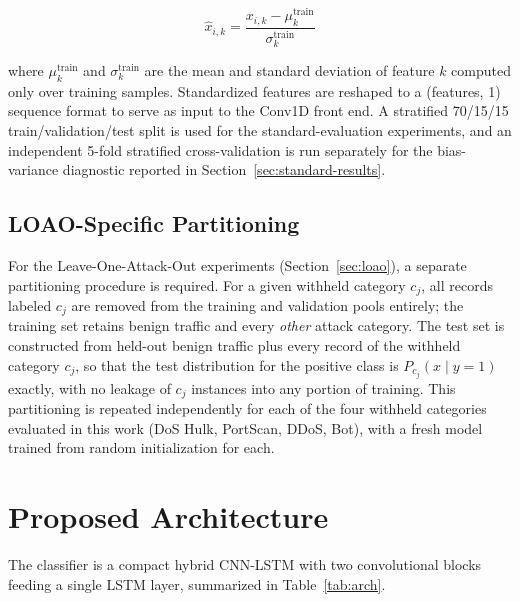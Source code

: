 \documentclass[11pt]{article}
\begin{document}
\begin{equation}
\hat{x}_{i,k} = \frac{x_{i,k} - \mu_k^{\text{train}}}{\sigma_k^{\text{train}}}
\end{equation}

where $\mu_k^{\text{train}}$ and $\sigma_k^{\text{train}}$ are the mean and standard deviation of
feature $k$ computed only over training samples. Standardized features are reshaped to a
(features, 1) sequence format to serve as input to the Conv1D front end. A stratified 70/15/15
train/validation/test split is used for the standard-evaluation experiments, and an independent
5-fold stratified cross-validation is run separately for the bias-variance diagnostic reported in
Section~\ref{sec:standard-results}.

\subsection{LOAO-Specific Partitioning}

For the Leave-One-Attack-Out experiments (Section~\ref{sec:loao}), a separate partitioning
procedure is required. For a given withheld category $c_j$, all records labeled $c_j$ are removed
from the training and validation pools entirely; the training set retains benign traffic and every
\emph{other} attack category. The test set is constructed from held-out benign traffic plus every
record of the withheld category $c_j$, so that the test distribution for the positive class is
$P_{c_j}(x \mid y=1)$ exactly, with no leakage of $c_j$ instances into any portion of training. This
partitioning is repeated independently for each of the four withheld categories evaluated in this
work (DoS Hulk, PortScan, DDoS, Bot), with a fresh model trained from random initialization for each.

\section{Proposed Architecture}
\label{sec:architecture}

The classifier is a compact hybrid CNN-LSTM with two convolutional blocks feeding a single LSTM
layer, summarized in Table~\ref{tab:arch}.
\end{document}
